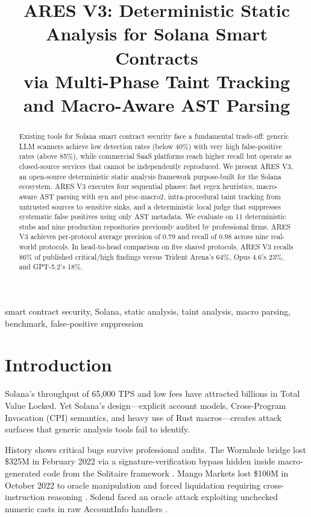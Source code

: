 \documentclass[conference]{IEEEtran}
\title{ARES V3: Deterministic Static Analysis for Solana Smart Contracts\\ via Multi-Phase Taint Tracking and Macro-Aware AST Parsing}
\author{
\IEEEauthorblockN{Nyoko Karma Nugroho}
\IEEEauthorblockA{Founder, Daemon Protocol\\nyokokarmanugroho@daemonprotocol.com}
\and
\IEEEauthorblockN{Fikri Armia Fahmi}
\IEEEauthorblockA{AI Engineer, Daemon Protocol\\fikriarmia27@gmail.com}
}
\begin{document}
\maketitle

\begin{abstract}
Existing tools for Solana smart contract security face a fundamental trade-off: generic LLM scanners achieve low detection rates (below 40\%) with very high false-positive rates (above 85\%), while commercial SaaS platforms reach higher recall but operate as closed-source services that cannot be independently reproduced. We present ARES V3, an open-source deterministic static analysis framework purpose-built for the Solana ecosystem. ARES V3 executes four sequential phases: fast regex heuristics, macro-aware AST parsing with syn and proc-macro2, intra-procedural taint tracking from untrusted sources to sensitive sinks, and a deterministic local judge that suppresses systematic false positives using only AST metadata. We evaluate on 11 deterministic stubs and nine production repositories previously audited by professional firms. ARES V3 achieves per-protocol average precision of 0.79 and recall of 0.98 across nine real-world protocols. In head-to-head comparison on five shared protocols, ARES V3 recalls 86\% of published critical/high findings versus Trident Arena's 64\%, Opus 4.6's 23\%, and GPT-5.2's 18\%.
\end{abstract}

\begin{IEEEkeywords}
smart contract security, Solana, static analysis, taint analysis, macro parsing, benchmark, false-positive suppression
\end{IEEEkeywords}

\section{Introduction}

Solana'{}s throughput of 65,000 TPS and low fees have attracted billions in Total Value Locked. Yet Solana'{}s design---explicit account models, Cross-Program Invocation (CPI) semantics, and heavy use of Rust macros---creates attack surfaces that generic analysis tools fail to identify.

History shows critical bugs survive professional audits. The Wormhole bridge lost \$325M in February 2022 via a signature-verification bypass hidden inside macro-generated code from the Solitaire framework \cite{wormhole2026solitaire}. Mango Markets lost \$100M in October 2022 to oracle manipulation and forced liquidation requiring cross-instruction reasoning \cite{ottersec2022mango}. Solend faced an oracle attack exploiting unchecked numeric casts in raw AccountInfo handlers \cite{neodyme2022solend}.
\end{document}
